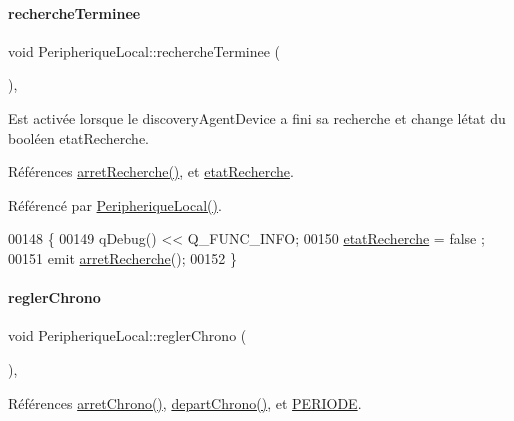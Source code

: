\paragraph{\texorpdfstring{recherche\+Terminee}{rechercheTerminee}}
{\footnotesize\ttfamily void Peripherique\+Local\+::recherche\+Terminee (\begin{DoxyParamCaption}{ }\end{DoxyParamCaption})\hspace{0.3cm}{\ttfamily [protected]}, {\ttfamily [slot]}}

Est activée lorsque le discovery\+Agent\+Device a fini sa recherche et change l\textquotesingle{}état du booléen etat\+Recherche. 

Références \hyperlink{class_peripherique_local_a05dad5bf82b579731591407a0c098957}{arret\+Recherche()}, et \hyperlink{class_peripherique_local_a6638c29f6f75c3b4d329d93ae6ea4a48}{etat\+Recherche}.



Référencé par \hyperlink{class_peripherique_local_a99a652b8659a3692f164cf1a0382e4bf}{Peripherique\+Local()}.


\begin{DoxyCode}
00148 \{
00149     qDebug() << Q\_FUNC\_INFO;
00150     \hyperlink{class_peripherique_local_a6638c29f6f75c3b4d329d93ae6ea4a48}{etatRecherche} = false ;
00151     emit \hyperlink{class_peripherique_local_a05dad5bf82b579731591407a0c098957}{arretRecherche}();
00152 \}
\end{DoxyCode}
\mbox{\label{class_peripherique_local_ae4f8521445a9dc3a51ff116e1f6597d7}} 
\paragraph{\texorpdfstring{regler\+Chrono}{reglerChrono}}
{\footnotesize\ttfamily void Peripherique\+Local\+::regler\+Chrono (\begin{DoxyParamCaption}{ }\end{DoxyParamCaption})\hspace{0.3cm}{\ttfamily [protected]}, {\ttfamily [slot]}}



Références \hyperlink{class_peripherique_local_a150599c1ded2462eb0e2d1d943459a34}{arret\+Chrono()}, \hyperlink{class_peripherique_local_a8c29d255e41df4bc381f4ff2d1451416}{depart\+Chrono()}, et \hyperlink{chronometreutilisation_8h_ad0750d12e2f5f404ec458d4066a53fa4}{P\+E\+R\+I\+O\+DE}.



